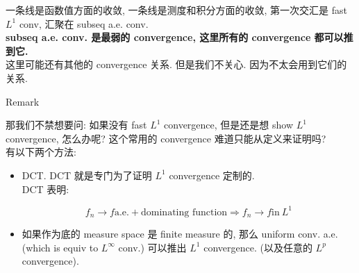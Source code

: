 \documentclass{qlnotes-export}
\begin{document}
一条线是函数值方面的收敛, 一条线是测度和积分方面的收敛, 第一次交汇是 fast \(L^{1}\) conv, 汇聚在 subseq a.e. conv.\\
\textbf{subseq a.e. conv. 是最弱的 convergence, 这里所有的 convergence 都可以推到它.}\\
这里可能还有其他的 convergence 关系. 但是我们不关心. 因为不太会用到它们的关系.

\begin{qlremark}{Remark}

那我们不禁想要问: 如果没有 fast \(L^{1}\) convergence, 但是还是想 show \(L^{1}\) convergence, 怎么办呢? 这个常用的 convergence 难道只能从定义来证明吗?\\
有以下两个方法:

\begin{itemize}
\item
  DCT. DCT 就是专门为了证明 \(L^{1}\) convergence 定制的.\\
  DCT 表明:

  \[f_{n}\rightarrow f\text{a.e.} + \text{dominating function}\Longrightarrow f_{n}\rightarrow f\text{in}\ L^{1}\]
\item
  如果作为底的 measure space 是 finite measure 的, 那么 uniform conv. a.e. (which is equiv to \(L^{\infty}\) conv.) 可以推出 \(L^{1}\) convergence. (以及任意的 \(L^{p}\) convergence).
\end{itemize}

\end{qlremark}
\end{document}
